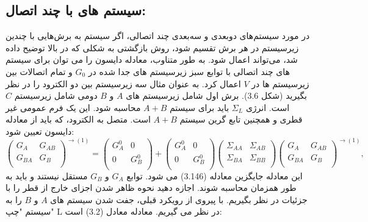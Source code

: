 \subsection*{سیستم های با چند اتصال:}
در مورد سیستم‌های دوبعدی و سه‌بعدی چند اتصالی، اگر سیستم به برش‌هایی با چندین زیرسیستم در هر برش تقسیم شود، روش بازگشتی به شکلی که در بالا توضیح داده شد، می‌تواند اعمال شود. به طور متناوب، معادله دایسون را می توان برای سیستم های چند اتصالی با توابع سبز زیرسیستم های جدا شده در $G_0$ و تمام اتصالات بین زیرسیستم ها در $V$ اعمال کرد.
به عنوان مثال سه زیرسیستم بین دو الکترود را در نظر بگیرید (شکل 3.6). برش اول شامل زیرسیستم های $A$ و $B$ دومی شامل زیرسیستم $C$ است. انرژی $\Sigma_{L}$ باید برای سیستم $A + B$ محاسبه شود. این یک فرم عمومی غیر قطری و همچنین تابع گرین سیستم $A + B$ است. متصل به الکترود، که باید از معادله دایسون تعیین شود:
\begin{equation}
    {{\left( \begin{matrix}
           {{G}_{A}} & {{G}_{AB}}  \\
           {{G}_{BA}} & {{G}_{B}}  \\
        \end{matrix} \right)}^{\to (1)}}=\left( \begin{matrix}
           G_{A}^{0} & 0  \\
           0 & G_{B}^{0}  \\
        \end{matrix} \right)+\left( \begin{matrix}
           G_{A}^{0} & 0  \\
           0 & G_{B}^{0}  \\
        \end{matrix} \right)\left( \begin{matrix}
           {{\Sigma }_{AA}} & {{\Sigma }_{AB}}  \\
           {{\Sigma }_{BA}} & {{\Sigma }_{BB}}  \\
        \end{matrix} \right){{\left( \begin{matrix}
           {{G}_{A}} & {{G}_{AB}}  \\
           {{G}_{BA}} & {{G}_{B}}  \\
        \end{matrix} \right)}^{\to (1)}},
\end{equation}
این معادله جایگزین معادله (3.146) می شود. توابع $G_A$ و $G_B$ مستقل نیستند و باید به طور همزمان محاسبه شوند.
اجازه دهید نحوه ظاهر شدن اجزای خارج از قطر را با جزئیات در نظر بگیریم. با پیروی از رویکرد قبلی، جفت شدن سیستم های $A$ و $B$ را به سیستم "چپ" L در نظر می گیریم. معادله معادل (3.2) است:
